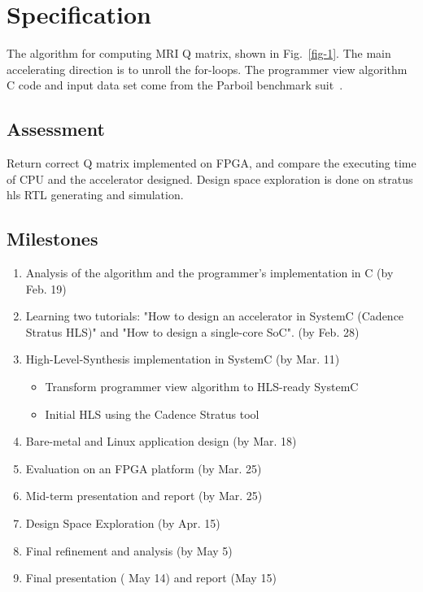 \documentclass{sig-alternate}
\begin{document}
\section{Specification}
The algorithm for computing MRI Q matrix, shown in Fig.~\ref{fig-1}. The main accelerating direction is to unroll the for-loops. The programmer view algorithm C code and input data set come from the Parboil benchmark suit~\cite{Rub1}.



\subsection{Assessment}
Return correct Q matrix implemented on FPGA, and compare the executing time of CPU and the accelerator designed. Design space exploration is done on stratus hls RTL generating and simulation.

\subsection{Milestones}\label{sec:arch}
\label{sec:milestones}

\vspace{-0.1in}
\begin{enumerate}
\setlength\itemsep{-0.15em}
  \item Analysis of the algorithm and the programmer's implementation in C (by Feb. 19)
  \item Learning two tutorials: "How to design an accelerator in SystemC (Cadence Stratus HLS)" and "How to design a single-core SoC"\cite{esp1}\cite{esp2}. (by Feb. 28)
  \item High-Level-Synthesis implementation in SystemC (by Mar. 11)
  \vspace{-2mm}
       \begin{itemize}
            \item Transform programmer view algorithm to HLS-ready SystemC
            \item Initial HLS using the Cadence Stratus tool
       \end{itemize}

  \item Bare-metal and Linux application design (by Mar. 18)  
  \item Evaluation on an FPGA platform (by Mar. 25)
  \item Mid-term presentation and report (by Mar. 25)
  \item Design Space Exploration (by Apr. 15)
  \item Final refinement and analysis (by May 5)
  \item Final presentation ( May 14) and report (May 15)
\end{enumerate}
\end{document}
